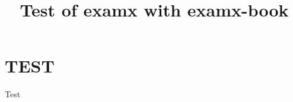 \documentclass{examx}
\title{Test of examx with examx-book}
\begin{document}
    \examcover
    \tableofcontents
    \section{TEST}
    Test
\end{document}
